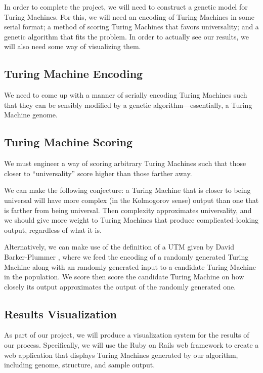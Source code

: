 In order to complete the project, we will need to construct a genetic
model for Turing Machines. For this, we will need an encoding of Turing
Machines in some serial format; a method of scoring Turing Machines that
favors universality; and a genetic algorithm that fits the problem. In
order to actually see our results, we will also need some way of
visualizing them.

\subsection{Turing Machine Encoding} 

We need to come up with a manner of serially encoding Turing Machines
such that they can be sensibly modified by a genetic
algorithm---essentially, a Turing Machine genome.

\subsection{Turing Machine Scoring} 

We must engineer a way of scoring arbitrary Turing Machines such that those
closer to ``universality'' score higher than those farther away.

We can make the following conjecture: a Turing Machine that is closer to
being universal will have more complex (in the Kolmogorov sense) output
than one that is farther from being universal. Then complexity
approximates universality, and we should give more weight to Turing
Machines that produce complicated-looking output, regardless of what it
is.

Alternatively, we can make use of the definition of a UTM given by David Barker-Plummer \cite{SEP_turing}, where we feed the encoding of a randomly generated Turing Machine along with an randomly generated input to a candidate Turing Machine in the population. We score then score the candidate Turing Machine on how closely its output approximates the output of the randomly generated one.

\subsection{Results Visualization}

As part of our project, we will produce a visualization system for the results of our process. Specifically, we will use the Ruby on Rails web framework to create a web application that displays Turing Machines generated by our algorithm, including genome, structure, and sample output.
